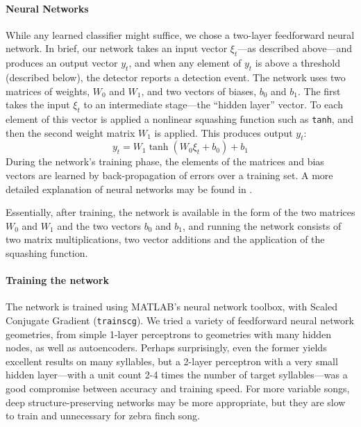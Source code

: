 \documentclass[10pt,letterpaper]{article}
\renewcommand{\subsubsection}[1]{\paragraph{#1}}
\begin{document}
\subsubsection{Neural Networks}

While any learned classifier might suffice, we chose a two-layer
feedforward neural network.  In brief, our network takes an input
vector $\xi_t$---as described above---and produces an output vector
$y_t$, and when any element of $y_t$ is above a threshold (described
below), the detector reports a detection event.  The network uses two
matrices of weights, $W_0$ and $W_1$, and two vectors of biases, $b_0$
and $b_1$.  The first takes the input $\xi_t$ to an intermediate
stage---the ``hidden layer'' vector.  To each element of this vector
is applied a nonlinear squashing function such as {\tt tanh}, and then
the second weight matrix $W_1$ is applied.  This produces output
$y_t$:
\begin{equation*}
  y_t = W_1 \tanh (W_0 \xi_t + b_0) + b_1
\end{equation*}
During the network's training phase, the elements of the matrices and bias vectors are learned by back-propagation of errors
over a training set.  A more detailed explanation of neural networks
may be found in \cite{hkp}.

Essentially, after training, the network is available in the form of
the two matrices $W_0$ and $W_1$ and the two vectors $b_0$ and $b_1$,
and running the network consists of two matrix multiplications, two
vector additions and the application of the squashing function.

\subsubsection{Training the network}

The network is trained using MATLAB's neural network toolbox, with Scaled Conjugate Gradient ({\tt trainscg}). We tried
a variety of feedforward neural network geometries, from simple
1-layer perceptrons to geometries with many hidden nodes, as well as
autoencoders. Perhaps surprisingly, even the former yields excellent
results on many syllables, but a 2-layer perceptron with a very small
hidden layer---with a unit count 2-4 times the number of target
syllables---was a good compromise between accuracy and training
speed. For more variable songs, deep structure-preserving networks may
be more appropriate, but they are slow to train and unnecessary for
zebra finch song.
\end{document}
